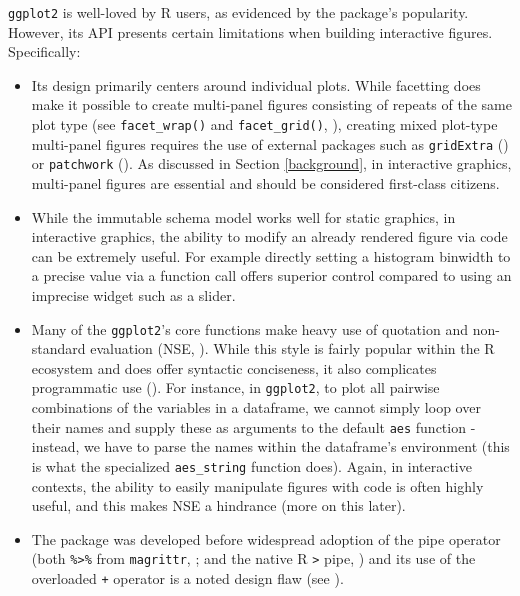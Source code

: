 \documentclass[
  openany]{book}
\providecommand{\tightlist}{%
  \setlength{\itemsep}{0pt}\setlength{\parskip}{0pt}}
\theoremstyle{definition}
\theoremstyle{definition}
\theoremstyle{definition}
\theoremstyle{definition}
\theoremstyle{remark}
\begin{document}
\texttt{ggplot2} is well-loved by R users, as evidenced by the package's popularity. However, its API presents certain limitations when building interactive figures. Specifically:

\begin{itemize}
\tightlist
\item
  Its design primarily centers around individual plots. While facetting does make it possible to create multi-panel figures consisting of repeats of the same plot type (see \texttt{facet\_wrap()} and \texttt{facet\_grid()}, ), creating mixed plot-type multi-panel figures requires the use of external packages such as \texttt{gridExtra} () or \texttt{patchwork} (). As discussed in Section \ref{background}, in interactive graphics, multi-panel figures are essential and should be considered first-class citizens.
\item
  While the immutable schema model works well for static graphics, in interactive graphics, the ability to modify an already rendered figure via code can be extremely useful. For example directly setting a histogram binwidth to a precise value via a function call offers superior control compared to using an imprecise widget such as a slider.
\item
  Many of the \texttt{ggplot2}'s core functions make heavy use of quotation and non-standard evaluation (NSE, ). While this style is fairly popular within the R ecosystem and does offer syntactic conciseness, it also complicates programmatic use (). For instance, in \texttt{ggplot2}, to plot all pairwise combinations of the variables in a dataframe, we cannot simply loop over their names and supply these as arguments to the default \texttt{aes} function - instead, we have to parse the names within the dataframe's environment (this is what the specialized \texttt{aes\_string} function does). Again, in interactive contexts, the ability to easily manipulate figures with code is often highly useful, and this makes NSE a hindrance (more on this later).\\
\item
  The package was developed before widespread adoption of the pipe operator (both \texttt{\%\textgreater{}\%} from \texttt{magrittr}, ; and the native R \texttt{\textbar{}\textgreater{}} pipe, ) and its use of the overloaded \texttt{+} operator is a noted design flaw (see ).
\end{itemize}
\end{document}
